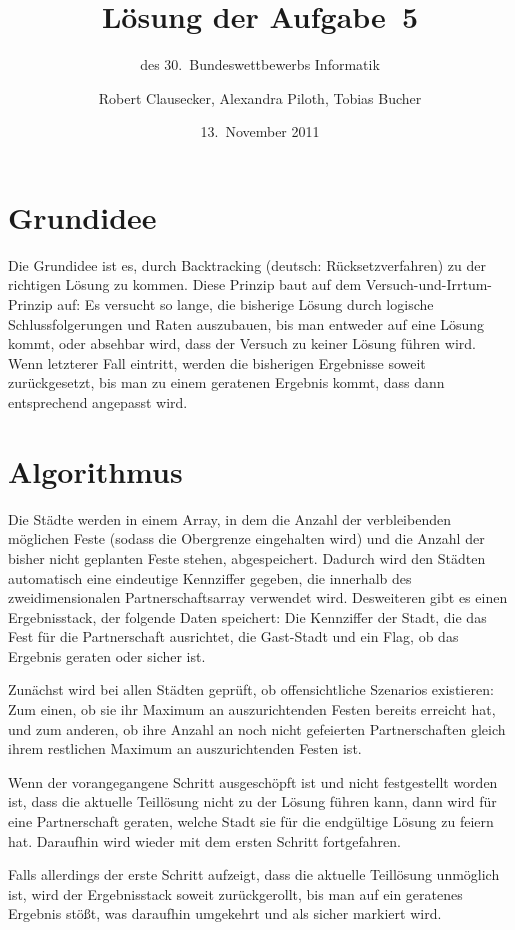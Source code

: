 \documentclass{scrartcl}
\title{Lösung der Aufgabe~5}
\subtitle{des 30.~Bundeswettbewerbs Informatik}
\author{Robert Clausecker, Alexandra Piloth, Tobias Bucher}
\date{13.~November 2011}
\begin{document}
\maketitle

\section{Grundidee}

Die Grundidee ist es, durch Backtracking (deutsch: Rücksetzverfahren) zu der richtigen Lösung zu kommen. Diese Prinzip baut auf dem Versuch-und-Irrtum-Prinzip auf: Es versucht so lange, die bisherige Lösung durch logische Schlussfolgerungen und Raten auszubauen, bis man entweder auf eine Lösung kommt, oder absehbar wird, dass der Versuch zu keiner Lösung führen wird. Wenn letzterer Fall eintritt, werden die bisherigen Ergebnisse soweit zurückgesetzt, bis man zu einem geratenen Ergebnis kommt, dass dann entsprechend angepasst wird.

\section{Algorithmus}

Die Städte werden in einem Array, in dem die Anzahl der verbleibenden möglichen Feste (sodass die Obergrenze eingehalten wird) und die Anzahl der bisher nicht geplanten Feste stehen, abgespeichert. Dadurch wird den Städten automatisch eine eindeutige Kennziffer gegeben, die innerhalb des zweidimensionalen Partnerschaftsarray verwendet wird. Desweiteren gibt es einen Ergebnisstack, der folgende Daten speichert: Die Kennziffer der Stadt, die das Fest für die Partnerschaft ausrichtet, die Gast-Stadt und ein Flag, ob das Ergebnis geraten oder sicher ist.

Zunächst wird bei allen Städten geprüft, ob offensichtliche Szenarios existieren: Zum einen, ob sie ihr Maximum an auszurichtenden Festen bereits erreicht hat, und zum anderen, ob ihre Anzahl an noch nicht gefeierten Partnerschaften gleich ihrem restlichen Maximum an auszurichtenden Festen ist.

Wenn der vorangegangene Schritt ausgeschöpft ist und nicht festgestellt worden ist, dass die aktuelle Teillösung nicht zu der Lösung führen kann, dann wird für eine Partnerschaft geraten, welche Stadt sie für die endgültige Lösung zu feiern hat. Daraufhin wird wieder mit dem ersten Schritt fortgefahren.

Falls allerdings der erste Schritt aufzeigt, dass die aktuelle Teillösung unmöglich ist, wird der Ergebnisstack soweit zurückgerollt, bis man auf ein geratenes Ergebnis stößt, was daraufhin umgekehrt und als sicher markiert wird.
\end{document}
